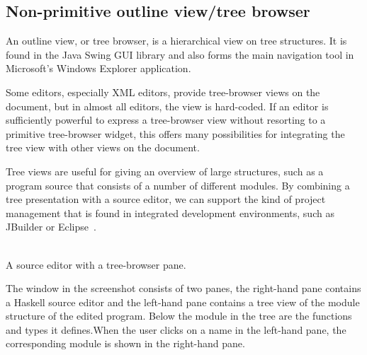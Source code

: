 \documentclass{speauth}
\begin{document}
%																
\subsection{Non-primitive outline view/tree browser}\label{sect:treeBrowser}

An outline view, or tree browser, is a hierarchical view on tree structures. It is found in the Java Swing GUI library and also forms the main navigation tool in Microsoft's Windows Explorer application. 


Some editors, especially XML editors, provide tree-browser views on the document, but in almost all editors, the view is hard-coded. If an editor is sufficiently powerful to express a tree-browser view without resorting to a primitive tree-browser widget, this offers many possibilities for integrating the tree view with other views on the document. 

Tree views are useful for giving an overview of large structures, such as a program source that consists of a number of different modules. By combining a tree presentation with a source editor, we can support the kind of project management that is found in integrated development environments, such as JBuilder or Eclipse~\cite{eclipse2001}. 



\begin{center}
\\ [3mm]
{\normalsize \sf  A source editor with a tree-browser pane.}
\end{center}


The window in the screenshot consists of two panes, the right-hand pane contains a Haskell source editor and the left-hand pane contains a tree view of the module structure of the edited program. \bc Below the module in the tree are the functions and types it defines.\ec When the user clicks on a name in the left-hand pane, the corresponding module is shown in the right-hand pane.
\end{document}
